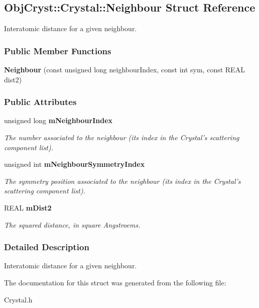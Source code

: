 \subsection{ObjCryst::Crystal::Neighbour Struct Reference}
\label{a00050}


Interatomic distance for a given neighbour.  
\subsubsection*{Public Member Functions}
\begin{DoxyCompactItemize}
\item 
{\bfseries Neighbour} (const unsigned long neighbourIndex, const int sym, const REAL dist2)\label{a00050_af3dfe5fb08c8c73dc5e804439b0e46c9}

\end{DoxyCompactItemize}
\subsubsection*{Public Attributes}
\begin{DoxyCompactItemize}
\item 
unsigned long {\bf mNeighbourIndex}\label{a00050_a00b603db2329cf55dd6bc66cf76e54ad}

\begin{DoxyCompactList}\small\item\em The number associated to the neighbour (its index in the Crystal's scattering component list). \item\end{DoxyCompactList}\item 
unsigned int {\bf mNeighbourSymmetryIndex}\label{a00050_a6ccf11f6f5ad2641cfeb22c8339fa2e5}

\begin{DoxyCompactList}\small\item\em The symmetry position associated to the neighbour (its index in the Crystal's scattering component list). \item\end{DoxyCompactList}\item 
REAL {\bf mDist2}\label{a00050_ac4b4d41dc4899ce7520d6b178602e2d3}

\begin{DoxyCompactList}\small\item\em The squared distance, in square Angstroems. \item\end{DoxyCompactList}\end{DoxyCompactItemize}


\subsubsection{Detailed Description}
Interatomic distance for a given neighbour. 

The documentation for this struct was generated from the following file:\begin{DoxyCompactItemize}
\item 
Crystal.h\end{DoxyCompactItemize}
